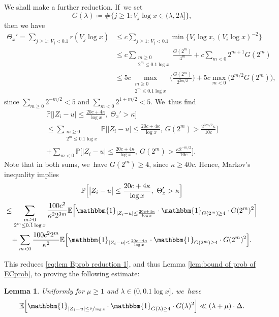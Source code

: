 \documentclass[10pt,a4paper]{amsart}
\newcommand{\PP}{\mathbb{P}}
\newcommand{\EE}{\mathbb{E}}
\newcommand{\one}{\mathbbm{1}}
\newcommand{\bg}{\big}
\newcommand{\bgg}{\Big}
\theoremstyle{plain}
\newtheorem{lem}[cor]{Lemma}
\theoremstyle{definition}
\begin{document}
We shall make a further reduction. If~we set
\[
G(\lambda)\coloneqq \#\bg\{j\ge1: V_j\log x\in (\lambda,2\lambda] \bg\},
\]
then we have
\[
\begin{split}
\Theta_x' =\sum_{j\ge1:\ V_j<0.1} r(V_j\log x)
&\le c\sum_{j\ge1:\ V_j<0.1}\min\bg\{V_i\log x,(V_i\log x)^{-2}\bg\} \\
&\le c\sum_{\substack{m\ge0 \\ 2^m\le 0.1\log x}} \frac{G(2^m)}{4^m} + c \sum_{m<0} 2^{m+1} G(2^m) \\
&\le 5c \max_{\substack{m\ge0 \\ 2^m\le 0.1\log x}} \bgg(\frac{G(2^m)}{2^{3m/2}} \bgg) + 5c \max_{m<0}\bg(2^{m/2} G(2^m)\bg),
\end{split}
\]
since $\sum_{m\ge0}2^{-m/2} <5$ and $\sum_{m<0}2^{1+m/2}< 5$. We~thus find
\begin{multline*}
\PP\bgg[ \bg| Z_i - u \bg|\le \frac{20c+4\kappa}{\log x},\ \Theta_x'>\kappa \bgg] \\
\le \sum_{\substack{m\ge0 \\ 2^m\le 0.1\log x}} \!\!\! \PP\bgg[ \bg| Z_i - u \bg|\le \frac{20c+4\kappa}{\log x},\ G(2^m)> \frac{2^{3m/2} \kappa}{10c} \bgg] \\
+\sum_{m<0} \PP\bgg[ \bg| Z_i - u \bg|\le \frac{20c+4\kappa}{\log x},\ G(2^m)> \frac{\kappa 2^{-m/2}}{10c} \bgg].
\end{multline*}
Note that in both sums, we~have $G(2^m)\ge 4$, since $\kappa\ge 40c$. Hence, Markov's inequality implies
\begin{multline*}
\PP\bgg[ \bg| Z_i - u \bg|\le \frac{20c+4\kappa}{\log x},\ \Theta_x'>\kappa \bgg] \\
\le \sum_{\substack{m\ge0 \\ 2^m\le 0.1\log x}} \frac{100c^2}{\kappa^22^{3m}}
\EE\bgg[ \one_{| Z_i - u |\le \frac{20c+4\kappa}{\log x} } \cdot \one_{G(2^m) \ge4} \cdot G(2^m)^2\bgg] \\
+\sum_{m<0} \frac{100c^22^m}{\kappa^2}
\EE\bgg[ \one_{| Z_i - u |\le \frac{20c+4\kappa}{\log x} }\cdot \one_{G(2^m) \ge4}\cdot G(2^m)^2\bgg].
\end{multline*}

This reduces \eqref{eq:lem Bprob reduction 1}, and thus Lemma \ref{lem:bound of prob of ECprob}, to proving the following estimate:

\begin{lem}
\label{lem:Bprob reduction 2} Uniformly for $\mu\ge1$ and $\lambda\in(0,0.1\log x]$, we~have
\[
\EE\bgg[ \one_{| Z_i - u |\le \sfrac{\mu}{\log x} } \cdot \one_{G(\lambda) \ge4} \cdot G(\lambda)^2 \bgg]
\ll (\lambda+\mu)\cdot \Delta.
\]
\end{lem}
\end{document}
